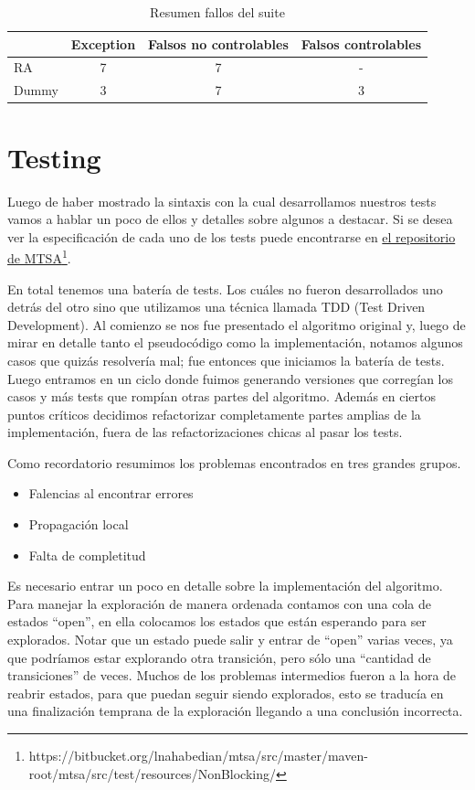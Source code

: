\begin{table}
	\centering
	\begin{tabular}{|l|c|c|c|}
		\hline
		& Exception & Falsos no controlables & Falsos controlables \\ \hline
		RA & 7 & 7 & - \\ \hline
		Dummy & 3 & 7 & 3 \\ 
		\hline
	\end{tabular}
	\caption{Resumen fallos del suite}
	\label{tab:resultadosTest}
\end{table}




\section{Testing}
Luego de haber mostrado la sintaxis con la cual desarrollamos nuestros tests vamos a hablar un poco de ellos y detalles sobre algunos a destacar. Si se desea ver la especificación de cada uno de los tests puede encontrarse en \href{https://bitbucket.org/lnahabedian/mtsa/src/master/maven-root/mtsa/src/test/resources/NonBlocking/}{el repositorio de MTSA}\footnote{https://bitbucket.org/lnahabedian/mtsa/src/master/maven-root/mtsa/src/test/resources/NonBlocking/}.

En total tenemos una batería de \totalTests tests. Los cuáles no fueron desarrollados uno detrás del otro sino que utilizamos una técnica llamada TDD (Test Driven Development). Al comienzo se nos fue presentado el algoritmo original y, luego de mirar en detalle tanto el pseudocódigo como la implementación, notamos algunos casos que quizás resolvería mal; fue entonces que iniciamos la batería de tests. 
Luego entramos en un ciclo donde fuimos generando versiones que corregían los casos y más tests que rompían otras partes del algoritmo. Además en ciertos puntos críticos decidimos refactorizar completamente partes amplias de la implementación, fuera de las refactorizaciones chicas al pasar los tests.

Como recordatorio resumimos los problemas encontrados en tres grandes grupos.
\begin{itemize}
 \item Falencias al encontrar errores
 \item Propagación local
 \item Falta de completitud
\end{itemize}

Es necesario entrar un poco en detalle sobre la implementación del algoritmo. Para manejar la exploración de manera ordenada contamos con una cola de estados ``open'', en ella colocamos los estados que están esperando para ser explorados. Notar que un estado puede salir y entrar de ``open'' varias veces, ya que podríamos estar explorando otra transición, pero sólo una ``cantidad de transiciones'' de veces. Muchos de los problemas intermedios fueron a la hora de reabrir estados, para que puedan seguir siendo explorados, esto se traducía en una finalización temprana de la exploración llegando a una conclusión incorrecta.

